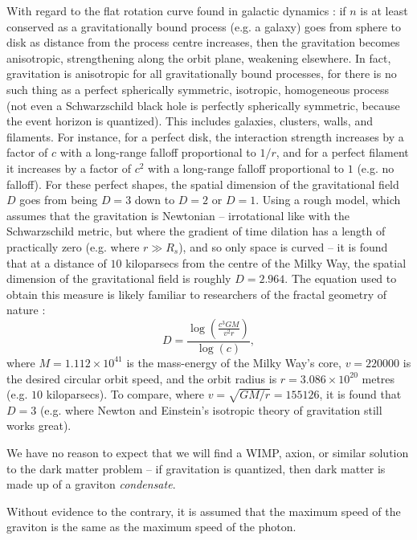 \documentclass[12pt]{article}
\begin{document}
{With regard to the flat rotation curve found in galactic dynamics \cite{binney}: if $n$ is at least conserved as a gravitationally bound process (e.g. a galaxy) goes from sphere to disk as distance from the process centre increases, then the gravitation becomes anisotropic, strengthening along the orbit plane, weakening elsewhere.
In fact, gravitation is anisotropic for all gravitationally bound processes, for there is no such thing as a perfect spherically symmetric, isotropic, homogeneous process (not even a Schwarzschild black hole is perfectly spherically symmetric, because the event horizon is quantized).
This includes galaxies, clusters, walls, and filaments.
For instance, for a perfect disk, the interaction strength increases by a factor of $c$ with a long-range falloff proportional to $1/r$, and for a perfect filament it increases by a factor of $c^2$ with a long-range falloff proportional to $1$ (e.g. no falloff).
For these perfect shapes, the spatial dimension of the gravitational field $D$ goes from being $D = 3$ down to $D = 2$ or $D = 1$.
Using a rough model, which assumes that the gravitation is Newtonian -- irrotational like with the Schwarzschild metric, but where the gradient of time dilation has a length of practically zero (e.g. where $r \gg R_s$), and so only space is curved -- it is found that at a distance of $10$ kiloparsecs from the centre of the Milky Way, the spatial dimension of the gravitational field is roughly $D = 2.964$.
The equation used to obtain this measure is likely familiar to researchers of the fractal geometry of nature \cite{mandelbrot}:
\begin{equation}
D = \frac{ \log\left(\frac{c^3 G M}{ v^2 r } \right)} { \log(c) },
\end{equation}
where $M = 1.112 \times 10^{41}$ is the mass-energy of the Milky Way's core, $v = 220000$ is the desired circular orbit speed, and the orbit radius is $r = 3.086 \times 10^{20}$ metres (e.g. $10$ kiloparsecs).
To compare, where $v = \sqrt{GM/r} = 155126$, it is found that $D = 3$ (e.g. where Newton and Einstein's isotropic theory of gravitation still works great).

We have no reason to expect that we will find a WIMP, axion, or similar solution \cite{berger, aalbers, quiskamp, haipeng, hui, ackerman} to the dark matter problem -- if gravitation is quantized, then dark matter is made up of a graviton {\textit{condensate}}.

Without evidence to the contrary, it is assumed that the maximum speed of the graviton is the same as the maximum speed of the photon.






}
\end{document}
